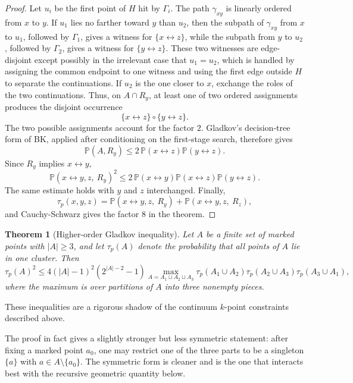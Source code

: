 \documentclass[11pt,reqno]{book}
\numberwithin{equation}{chapter}
\theoremstyle{plain}
\newtheorem{theorem}{Theorem}[chapter]
\theoremstyle{definition}
\theoremstyle{remark}
\renewcommand{\P}{\mathbb P}
\newcommand{\1}{\mathbf 1}
\begin{document}
\begin{proof}
Let \(u_i\) be the first point of \(H\) hit by \(\Gamma_i\). The path
\(\gamma_{xy}\) is linearly ordered from \(x\) to \(y\). If \(u_1\) lies no
farther toward \(y\) than \(u_2\), then the subpath of \(\gamma_{xy}\) from
\(x\) to \(u_1\), followed by \(\Gamma_1\), gives a witness for
\(\{x\leftrightarrow z\}\), while the subpath from \(y\) to \(u_2\), followed
by \(\Gamma_2\), gives a witness for \(\{y\leftrightarrow z\}\). These two
witnesses are edge-disjoint except possibly in the irrelevant case that
\(u_1=u_2\), which is handled by assigning the common endpoint to one
witness and using the first edge outside \(H\) to separate the continuations.
If \(u_2\) is the one closer to \(x\), exchange the roles of the two
continuations. Thus, on \(A\cap R_y\), at least one of two ordered
assignments produces the disjoint occurrence
\[
  \{x\leftrightarrow z\}\circ\{y\leftrightarrow z\}.
\]
The two possible assignments account for the factor \(2\). Gladkov's
decision-tree form of BK, applied after conditioning on the first-stage
search, therefore gives
\[
  \P(A,R_y)\leq 2\,\P(x\leftrightarrow z)\P(y\leftrightarrow z).
\]
Since $R_y$ implies $x\leftrightarrow y$,
\[
  \P(x\leftrightarrow y,z,\ R_y)^2
  \leq
  2\,\P(x\leftrightarrow y)\P(x\leftrightarrow z)\P(y\leftrightarrow z).
\]
The same estimate holds with $y$ and $z$ interchanged. Finally,
\[
  \tau_p(x,y,z)
  =
  \P(x\leftrightarrow y,z,\ R_y)
  +
  \P(x\leftrightarrow y,z,\ R_z),
\]
and Cauchy-Schwarz gives the factor $8$ in the theorem.
\end{proof}

\begin{theorem}[Higher-order Gladkov inequality]
\label{thm:higher-order-gladkov}
Let \(A\) be a finite set of marked points with \(|A|\geq3\), and let
\(\tau_p(A)\) denote the probability that all points of \(A\) lie in one
cluster. Then
\[
  \tau_p(A)^2
  \leq
  4(|A|-1)^2(2^{|A|-2}-1)
  \max_{A=A_1\sqcup A_2\sqcup A_3}
  \tau_p(A_1\cup A_2)
  \tau_p(A_2\cup A_3)
  \tau_p(A_3\cup A_1),
\]
where the maximum is over partitions of \(A\) into three nonempty pieces.
\end{theorem}

These inequalities are a rigorous shadow of the continuum \(k\)-point
constraints described above.

The proof in fact gives a slightly stronger but less symmetric statement:
after fixing a marked point \(a_0\), one may restrict one of the three parts
to be a singleton \(\{a\}\) with \(a\in A\setminus\{a_0\}\). The symmetric
form is cleaner and is the one that interacts best with the recursive
geometric quantity below.
\end{document}
